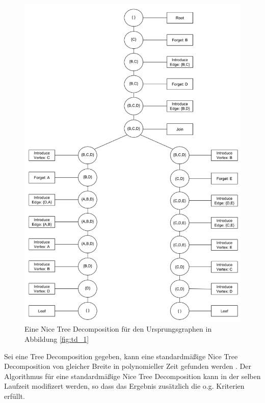 \begin{definition}
\begin{figure}
  \centering
    \includegraphics[width=1.0\textwidth]{./imgs/TD_3.png}
  	\caption{Eine Nice Tree Decomposition für den Ursprungsgraphen in Abbildung \ref{fig:td_1}}
\end{figure}

Sei eine Tree Decomposition gegeben, kann eine standardmäßige Nice Tree Decomposition von gleicher Breite in polynomieller Zeit gefunden werden \cite{kloks1994}. Der Algorithmus für eine standardmäßige Nice Tree Decomposition kann in der selben Laufzeit  modifizert werden, so dass das Ergebnis zusätzlich die o.g. Kriterien erfüllt.
\end{definition}

